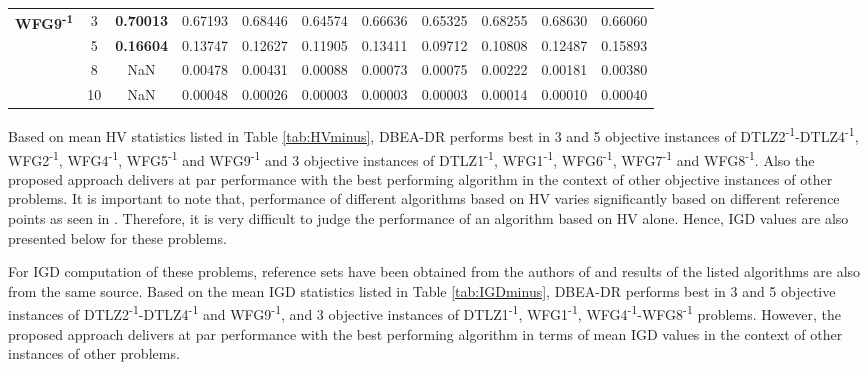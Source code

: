 \documentclass[conference]{IEEEtran}
\begin{document}
\begin{table*}[!htb]
\begin{tabular}{|c|c|c|c|c|c|c|c|c|c|c|}
	\multirow{4}{*}{\textbf{WFG9\textsuperscript{-1}}}  & 3          & \textbf{0.70013} & 0.67193           & 0.68446               & 0.64574          & 0.66636             & 0.65325             & 0.68255            & 0.68630              & 0.66060          \\ \cline{2-11} 
	& 5          & \textbf{0.16604} & 0.13747           & 0.12627               & 0.11905          & 0.13411             & 0.09712             & 0.10808            & 0.12487              & 0.15893          \\ \cline{2-11} 
	& 8          & NaN              & 0.00478           & 0.00431               & 0.00088          & 0.00073             & 0.00075             & 0.00222            & 0.00181              & 0.00380          \\ \cline{2-11} 
	& 10         & NaN              & 0.00048           & 0.00026               & 0.00003          & 0.00003             & 0.00003             & 0.00014            & 0.00010              & 0.00040          \\ \hline
\end{tabular}
\end{table*}

 Based on mean HV statistics listed in Table \ref{tab:HVminus}, DBEA-DR performs best in 3 and 5 objective instances of DTLZ2\textsuperscript{-1}-DTLZ4\textsuperscript{-1}, WFG2\textsuperscript{-1}, WFG4\textsuperscript{-1}, WFG5\textsuperscript{-1} and WFG9\textsuperscript{-1} and 3 objective instances of DTLZ1\textsuperscript{-1}, WFG1\textsuperscript{-1}, WFG6\textsuperscript{-1}, WFG7\textsuperscript{-1} and WFG8\textsuperscript{-1}. Also the proposed approach delivers at par performance with the best performing algorithm in the context of other objective instances of other problems. It is important to note that, performance of different algorithms based on HV varies significantly based on different reference points as seen in \cite{ishibuchi2016inverse}. Therefore, it is very difficult to judge the performance of an algorithm based on HV alone. Hence, IGD values are also presented below for these problems.  
 
 For IGD computation of these problems, reference sets have been obtained from the authors of \cite{ishibuchi2016inverse} and results of the listed algorithms are also from the same source\cite{ishibuchi2016inverse}. Based on the mean IGD statistics listed in Table \ref{tab:IGDminus}, DBEA-DR performs best in 3 and 5 objective instances of DTLZ2\textsuperscript{-1}-DTLZ4\textsuperscript{-1} and WFG9\textsuperscript{-1}, and 3 objective instances of DTLZ1\textsuperscript{-1}, WFG1\textsuperscript{-1}, WFG4\textsuperscript{-1}-WFG8\textsuperscript{-1} problems. However, the proposed approach delivers at par performance with the best performing algorithm in terms of mean IGD values in the context of other instances of other problems. 
\end{document}
